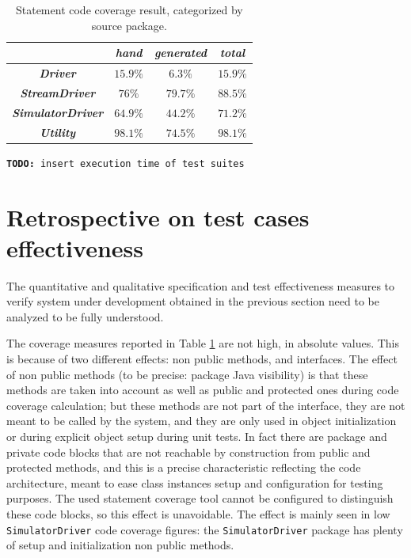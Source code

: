 \documentclass{article} \usepackage{times}
\newcommand{\lil}[1]{\texttt{\lstinline|#1|}}
\newcommand{\todo}[1]{\texttt{\textbf{TODO:} #1}}
\begin{document}
\begin{table}[htbp]
  \caption{Statement code coverage result, categorized by source package.}
  \label{tab:statement_code_coverage}
  \begin{center}
    \begin{tabular}{|c|c|c|c|}\hline
      & \textbf{\textit{hand}} & \textbf{\textit{generated}} &
      \textbf{\textit{total}} \\\hline
      \textbf{\textit{Driver}} & $15.9 \%$ & $6.3 \%$ & $15.9 \%$ \\\hline
      \textbf{\textit{StreamDriver}} & $76 \%$ & $79.7 \%$ & $88.5 \%$ \\\hline
      \textbf{\textit{SimulatorDriver}} & $64.9 \%$ & $44.2 \%$ &
      $71.2 \%$ \\\hline
      \textbf{\textit{Utility}} & $98.1 \%$ & $74.5 \%$ & $98.1 \%$ \\\hline
    \end{tabular}
  \end{center}
\end{table}

\todo{insert execution time of test suites}



\section{Retrospective on test cases effectiveness}
\label{sec:test_cases_retrospectives}

The quantitative and qualitative specification and test effectiveness
measures to verify system under development obtained
in the previous section need to be analyzed to be fully understood.

The coverage measures reported in Table
\ref{tab:statement_code_coverage} are not high, in absolute
values. This is because of two different effects: non public methods,
and interfaces. The effect of non public methods (to be precise:
package Java visibility) is that these methods are taken into account
as well as public and protected ones during code coverage calculation;
but these methods are not part of the interface, they are not meant to
be called by the system, and they are only used in object
initialization or during explicit object setup during unit tests. In
fact there are package and private code blocks that are not reachable
by construction from public and protected methods, and this is a
precise characteristic reflecting the code architecture, meant to ease
class instances setup and configuration for testing purposes. The used
statement coverage tool cannot be configured to distinguish these code
blocks, so this effect is unavoidable. The effect is mainly seen in
low \lil{SimulatorDriver} code coverage figures: the
\lil{SimulatorDriver} package has plenty of setup and initialization
non public methods.
\end{document}
